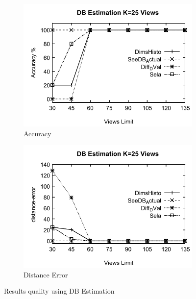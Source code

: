 \begin{figure}
  \begin{subfigure}[b]{0.45\textwidth}
    \includegraphics[width=\textwidth]{Cost11.pdf}
    \caption{Accuracy }
    \label{fig:figCost11}%
  \end{subfigure}
  \begin{subfigure}[b]{0.45\textwidth}
    \includegraphics[width=\textwidth]{Cost12.pdf}
  \caption{Distance Error  }
     \label{fig:figCost12}%
  \end{subfigure}
  \caption{ Results quality using DB Estimation  }
  \end{figure}

 
